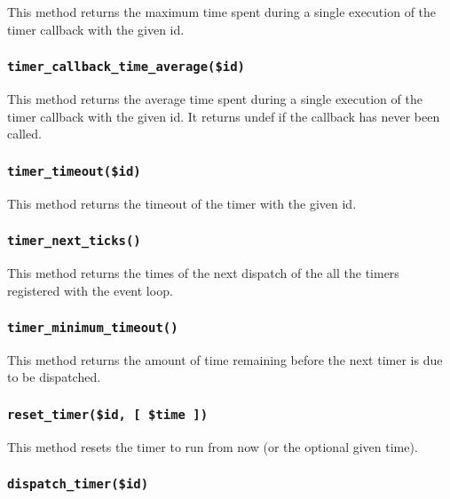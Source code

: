 \documentclass[12pt,a4paper]{article}
\begin{document}
This method returns the maximum time spent during a single execution
of the timer callback with the given id.

\subsubsection*{\texttt{timer\_callback\_time\_average(\$id)}\label{xPL::Listener_timer_callback_time_average_id_}}


This method returns the average time spent during a single execution
of the timer callback with the given id.  It returns undef if the
callback has never been called.

\subsubsection*{\texttt{timer\_timeout(\$id)}\label{xPL::Listener_timer_timeout_id_}}


This method returns the timeout of the timer with the given id.

\subsubsection*{\texttt{timer\_next\_ticks()}\label{xPL::Listener_timer_next_ticks_}}


This method returns the times of the next dispatch of the all the
timers registered with the event loop.

\subsubsection*{\texttt{timer\_minimum\_timeout()}\label{xPL::Listener_timer_minimum_timeout_}}


This method returns the amount of time remaining before the next timer
is due to be dispatched.

\subsubsection*{\texttt{reset\_timer(\$id, [ \$time ])}\label{xPL::Listener_reset_timer_id_time_}}


This method resets the timer to run from now (or the optional given time).

\subsubsection*{\texttt{dispatch\_timer(\$id)}\label{xPL::Listener_dispatch_timer_id_}}
\end{document}
